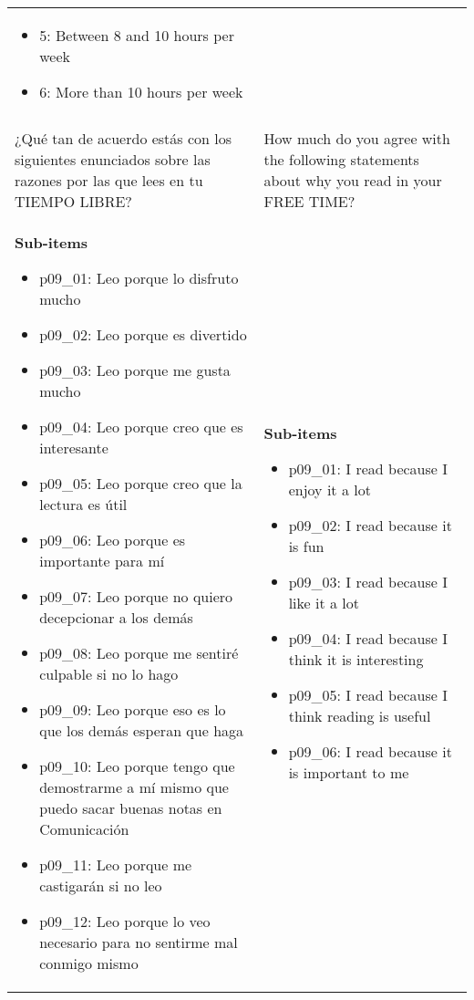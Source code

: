 \documentclass[11pt]{article}
\begin{document}
\begin{longtable}{@{}LL@{}}
\begin{itemize}[leftmargin=*]
\item 5: Between 8 and 10 hours per week
\item 6: More than 10 hours per week\end{itemize} \\
\addlinespace[4pt]
 \\ 
¿Qué tan de acuerdo estás con los siguientes enunciados sobre las razones por las que lees en tu TIEMPO LIBRE? & How much do you agree with the following statements about why you read in your FREE TIME? \\
\textbf{Sub-items}\par\begin{itemize}[leftmargin=*]\item p09\_01: Leo porque lo disfruto mucho
\item p09\_02: Leo porque es divertido
\item p09\_03: Leo porque me gusta mucho
\item p09\_04: Leo porque creo que es interesante
\item p09\_05: Leo porque creo que la lectura es útil
\item p09\_06: Leo porque es importante para mí
\item p09\_07: Leo porque no quiero decepcionar a los demás
\item p09\_08: Leo porque me sentiré culpable si no lo hago
\item p09\_09: Leo porque eso es lo que los demás esperan que haga
\item p09\_10: Leo porque tengo que demostrarme a mí mismo que puedo sacar buenas notas en Comunicación
\item p09\_11: Leo porque me castigarán si no leo
\item p09\_12: Leo porque lo veo necesario para no sentirme mal conmigo mismo\end{itemize} & \textbf{Sub-items}\par\begin{itemize}[leftmargin=*]\item p09\_01: I read because I enjoy it a lot
\item p09\_02: I read because it is fun
\item p09\_03: I read because I like it a lot
\item p09\_04: I read because I think it is interesting
\item p09\_05: I read because I think reading is useful
\item p09\_06: I read because it is important to me

\end{itemize}
\end{longtable}
\end{document}
